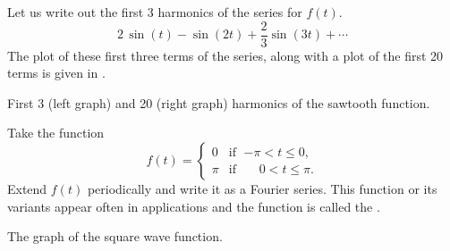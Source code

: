 \begin{example}
Let us write out the first 3 harmonics of the series for $f(t)$.
\begin{equation*}
2 \, \sin (t)
- \sin (2t)
+\frac{2}{3} \sin (3t)
+ \cdots
\end{equation*}
The plot of these first three terms of the series, along with a plot
of the first 20 terms is given in
.

\begin{myfig}
\capstart
\caption{First 3 (left graph) and 20 (right graph) harmonics of the sawtooth
function.\label{ts:sawtoothfsfig}}
\end{myfig}
\end{example}

\begin{example}
Take the function
\begin{equation*}
f(t) =
\begin{cases}
0 & \text{if } \;{-\pi} < t \leq 0 , \\
\pi & \text{if } \;\phantom{-}0 < t \leq \pi .
\end{cases}
\end{equation*}
\nopagebreak[4]%
Extend $f(t)$ periodically and write it 
as a Fourier series.  This function or its variants appear often
in applications and the function is called the
\emph{}.

\begin{myfig}
\capstart
{}
\caption{The graph of the square wave function.\label{ts:squarewavefig}}
\end{myfig}


\end{example}
